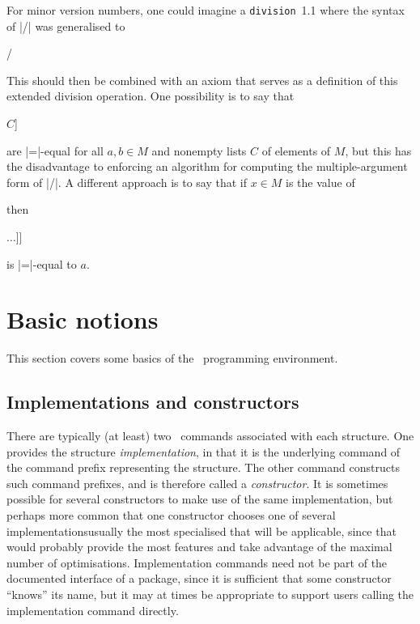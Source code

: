 \documentclass{mtmtcl}
\theoremstyle{plain}
\theoremstyle{remark}
\begin{document}
For minor version numbers, one could imagine a \texttt{division}~1.1 
where the syntax of |/| was generalised to
\begin{displaysyntax}
   /  \regplus
\end{displaysyntax}
This should then be combined with an axiom that serves as a 
definition of this extended division operation. One possibility is to 
say that
\begin{displaysyntax}
  [$M$ / $a$ $b$ \splode$C$]\par
  [$M$ / [$M$ / $a$ $b$] \splode$C$]
\end{displaysyntax}
are |=|-equal for all \(a,b \in M\) and nonempty lists $C$ of 
elements of $M$, but this has the disadvantage to enforcing an 
algorithm for computing the multiple-argument form of |/|. A 
different approach is to say that if \(x \in M\) is the value of
\begin{displaysyntax}
  [$M$ / $a$ $b_1$ \dots $b_n$]
\end{displaysyntax}
then
\begin{displaysyntax}
  [$M$ * $b_1$ [$\dots$ [$M$ * $b_n$ $x$]$\dots$]]
\end{displaysyntax}
is |=|-equal to $a$.



\section{Basic notions}

This section covers some basics of the \mtl\ programming environment.





\subsection{Implementations and constructors}

There are typically (at least) two \Tcl\ commands associated with each 
structure. One provides the structure \emph{implementation}, in that 
it is the underlying command of the command prefix representing the 
structure. The other command constructs such command prefixes, and is 
therefore called a \emph{constructor}. It is sometimes possible for 
several constructors to make use of the same implementation, but 
perhaps more common that one constructor chooses one of several 
implementations\Dash usually the most specialised that will be 
applicable, since that would probably provide the most features and 
take advantage of the maximal number of optimisations.
Implementation commands need not be part of the documented interface 
of a package, since it is sufficient that some constructor ``knows'' 
its name, but it may at times be appropriate to support users calling 
the implementation command directly.
\end{document}
